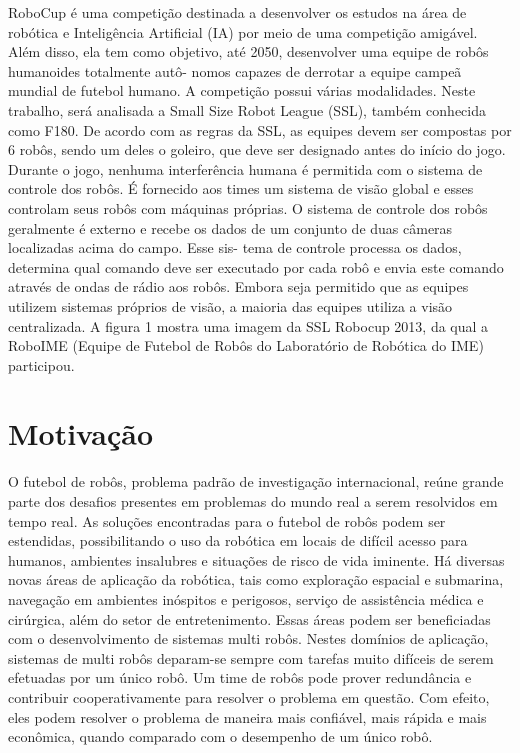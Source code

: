 RoboCup é uma competição destinada a desenvolver os estudos na área de robótica
e Inteligência Artificial (IA) por meio de uma competição amigável. Além disso, ela tem
como objetivo, até 2050, desenvolver uma equipe de robôs humanoides totalmente autô-
nomos capazes de derrotar a equipe campeã mundial de futebol humano. A competição
possui várias modalidades. Neste trabalho, será analisada a Small Size Robot League
(SSL), também conhecida como F180. De acordo com as regras da SSL, as equipes devem
ser compostas por 6 robôs, sendo um deles o goleiro, que deve ser designado antes do
início do jogo. Durante o jogo, nenhuma interferência humana é permitida com o sistema
de controle dos robôs. É fornecido aos times um sistema de visão global e esses controlam
seus robôs com máquinas próprias. O sistema de controle dos robôs geralmente é externo
e recebe os dados de um conjunto de duas câmeras localizadas acima do campo. Esse sis-
tema de controle processa os dados, determina qual comando deve ser executado por cada
robô e envia este comando através de ondas de rádio aos robôs. Embora seja permitido
que as equipes utilizem sistemas próprios de visão, a maioria das equipes utiliza a visão
centralizada. A figura 1 mostra uma imagem da SSL Robocup 2013, da qual a RoboIME
(Equipe de Futebol de Robôs do Laboratório de Robótica do IME) participou.

\section{Motivação}

O futebol de robôs, problema padrão de investigação internacional, reúne grande parte
dos desafios presentes em problemas do mundo real a serem resolvidos em tempo real. As
soluções encontradas para o futebol de robôs podem ser estendidas, possibilitando o uso
da robótica em locais de difícil acesso para humanos, ambientes insalubres e situações de
risco de vida iminente.
Há diversas novas áreas de aplicação da robótica, tais como exploração espacial e
submarina, navegação em ambientes inóspitos e perigosos, serviço de assistência médica
e cirúrgica, além do setor de entretenimento. Essas áreas podem ser beneficiadas com o
desenvolvimento de sistemas multi robôs. Nestes domínios de aplicação, sistemas de multi
robôs deparam-se sempre com tarefas muito difíceis de serem efetuadas por um único robô.
Um time de robôs pode prover redundância e contribuir cooperativamente para resolver
o problema em questão. Com efeito, eles podem resolver o problema de maneira mais
confiável, mais rápida e mais econômica, quando comparado com o desempenho de um
único robô.

